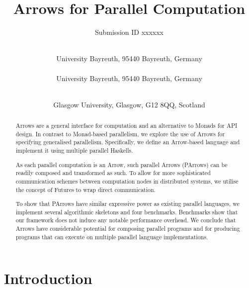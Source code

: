 \documentclass{jfp1}
\title{Arrows for Parallel Computation}
\author{Submission ID xxxxxx}
\author[M. Braun, O. Lobachev, and P. Trinder]%
        {\textls*{MARTIN BRAUN}\\
         University Bayreuth, 95440 Bayreuth, Germany\\
		 \textls*{OLEG LOBACHEV}\\
		 University Bayreuth, 95440 Bayreuth, Germany\\
		 \and\ \textls*{PHIL TRINDER}\\
		 Glasgow University, Glasgow, G12 8QQ, Scotland}
\newcommand{\citHughes}{\citep{HughesArrows}}
\newcommand{\comm}[2]{}
\newcommand{\olcomment}[1]{\comm{OL}{#1}}
\newcommand{\mbcomment}[1]{\comm{MB}{#1}}
\begin{document}
\label{firstpage}

\def\SymbReg{\textsuperscript{\textregistered}}

\maketitle

\begin{abstract}
Arrows are a general interface for computation and an alternative to Monads for API design. In contrast to Monad-based parallelism, we explore the use of Arrows for specifying generalised parallelism. Specifically, we define an Arrow-based language and implement it using multiple parallel Haskells.

As each parallel computation is an Arrow, such parallel Arrows (PArrows) can be readily composed and transformed as such.
To allow for more sophisticated communication schemes between computation nodes in distributed systems, we utilise the concept of Futures to wrap direct communication.

To show that PArrows have similar expressive power as existing parallel languages, we implement several algorithmic skeletons and four benchmarks. 
Benchmarks show that our framework does not induce any notable performance overhead. We conclude that Arrows have considerable potential for composing parallel programs and for producing programs that can execute on multiple parallel language implementations. 
%
%
\end{abstract}

\tableofcontents


\section{Introduction}
\label{sec:introduction}
\end{document}
